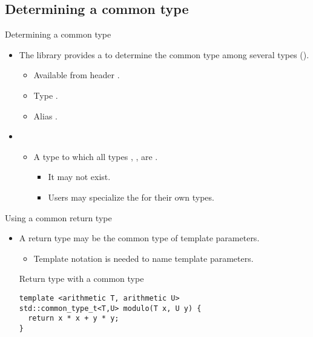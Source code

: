 \subsection{Determining a common type}

\begin{frame}[t,fragile]{Determining a common type}
\begin{itemize}
  \item The library provides a  to determine
        the common type among several types ().
    \begin{itemize}
      \item Available from header .
      \item Type .
      \item Alias .
    \end{itemize}

  \item {}
    \begin{itemize}
      \item A type to which all types , , \cppid{\ldots} are 
            .
         \begin{itemize}
           \item It may not exist.
           \item Users may specialize the  for their own types.
         \end{itemize}
    \end{itemize}
\end{itemize}
\end{frame}

\begin{frame}[t,fragile]{Using a common return type}
\begin{itemize}
  \item A return type may be the common type of template parameters.
    \begin{itemize}
      \item Template notation is needed to name template parameters.
    \end{itemize}

\begin{block}{Return type with a common type}
\begin{lstlisting}
template <arithmetic T, arithmetic U>
std::common_type_t<T,U> modulo(T x, U y) {
  return x * x + y * y;
}
\end{lstlisting}
\end{block}

\end{itemize}
\end{frame}
